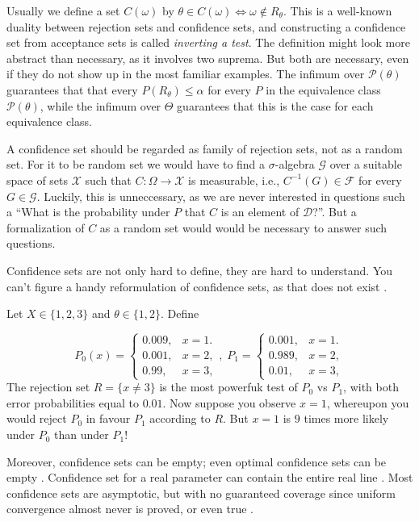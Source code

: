 Usually we define a set $C(\omega)$ by $\theta\in C(\omega)\iff\omega\notin R_{\theta}$.
This is a well-known duality between rejection sets and confidence
sets, and constructing a confidence set from acceptance sets is called
\emph{inverting a test}. The definition might look more abstract than
necessary, as it involves two suprema. But both are necessary, even
if they do not show up in the most familiar examples. The infimum
over $\mathcal{P}(\theta)$ guarantees that that every $P(R_{\theta})\leq\alpha$
for every $P$ in the equivalence class $\mathcal{P}(\theta)$, while
the infimum over $\Theta$ guarantees that this is the case for each
equivalence class.

A confidence set should be regarded as family of rejection sets, not
as a random set. For it to be random set we would have to find a $\sigma$-algebra
$\mathcal{G}$ over a suitable space of sets $\mathcal{X}$ such that
$C:\Omega\to\mathcal{X}$ is measurable, i.e., $C^{-1}(G)\in\mathcal{F}$
for every $G\in\mathcal{G}$. Luckily, this is unneccessary, as we
are never interested in questions such a ``What is the probability
under $P$ that $C$ is an element of $\mathcal{D}$?''. But a formalization
of $C$ as a random set would would be necessary to answer such questions.

Confidence sets are not only hard to define, they are hard to understand.
You can't figure a handy reformulation of confidence sets, as that
does not exist . 
\begin{example}
 Let $X\in\{1,2,3\}$ and $\theta\in\{1,2\}$. Define

\[
P_{0}(x)=\begin{cases}
0.009, & x=1.\\
0.001, & x=2,\\
0.99, & x=3,
\end{cases},\;P_{1}=\begin{cases}
0.001, & x=1.\\
0.989, & x=2,\\
0.01, & x=3,
\end{cases}
\]
The rejection set $R=\{x\neq3\}$ is the most powerfuk test of $P_{0}$
vs $P_{1}$, with both error probabilities equal to $0.01$. Now suppose
you observe $x=1$, whereupon you would reject $P_{0}$ in favour
$P_{1}$ according to $R$. But $x=1$ is $9$ times more likely under
$P_{0}$ than under $P_{1}$!
\end{example}

Moreover, confidence sets can be empty; even optimal confidence sets
can be empty . Confidence set for a real parameter
can contain the entire real line . Most confidence
sets are asymptotic, but with no guaranteed coverage since uniform
convergence almost never is proved, or even true .

